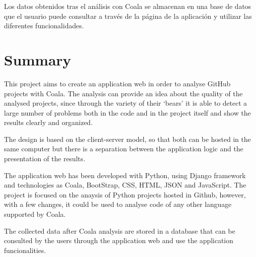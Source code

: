 \documentclass[a4paper, 12pt]{book}
\begin{document}
Los datos obtenidos tras el análisis con Coala se almacenan en una base de datos que el usuario
puede consultar a través de la página de la aplicación y utilizar las diferentes funcionalidades.

\chapter*{Summary}

This project aims to create an application web in order to analyse GitHub projects with Coala. The analysis can provide an idea about the quality of the analysed projects, since through the variety of their `bears' it is able to detect a large number of problems both in the code and in the project itself and show the results clearly and organized.

The design is based on the client-server model, so that both can be hosted in the same computer but there is a separation between the application logic and the presentation of the results.

The application web has been developed with Python, using Django framework and technologies as Coala, BootStrap, CSS, HTML, JSON and JavaScript. The project is focused on the anaysis of Python projects hosted in Github, however, with a few changes, it could be used to analyse code of any other language supported by Coala.

The collected data after Coala analysis are stored in a database that can be consulted by the users through the application web and use the application funcionalities.



\tableofcontents 
\cleardoublepage
\listoffigures %
\end{document}
